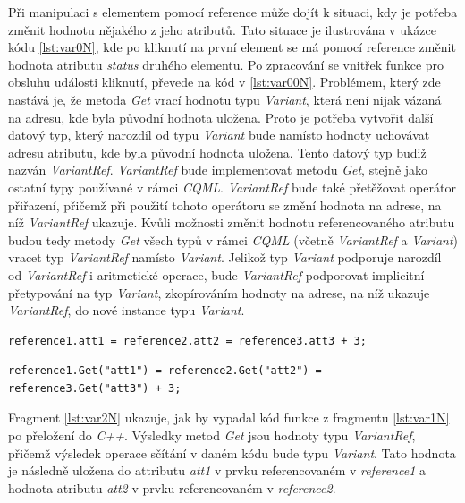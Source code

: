 \documentclass[11pt,twoside,a4paper]{book}
\begin{document}
Při manipulaci s elementem pomocí reference může dojít k situaci, kdy je potřeba změnit hodnotu nějakého z jeho atributů. Tato situace je ilustrována v ukázce kódu \ref{lst:var0N}, kde po kliknutí na první element se má pomocí reference změnit hodnota atributu \textit{status} druhého elementu. Po zpracování se vnitřek funkce pro obsluhu události kliknutí, převede na kód v \ref{lst:var00N}. Problémem, který zde nastává je, že metoda \textit{Get} vrací hodnotu typu \textit{Variant}, která není nijak vázaná na adresu, kde byla původní hodnota uložena. Proto je potřeba vytvořit další datový typ, který narozdíl od typu \textit{Variant} bude namísto hodnoty uchovávat adresu atributu, kde byla původní hodnota uložena. Tento datový typ budiž nazván \textit{VariantRef}. \textit{VariantRef} bude implementovat metodu \textit{Get}, stejně jako ostatní typy používané v rámci \textit{CQML}. \textit{VariantRef} bude také přetěžovat operátor přiřazení, přičemž při použití tohoto operátoru se změní hodnota na adrese, na níž \textit{VariantRef} ukazuje. Kvůli možnosti změnit hodnotu referencovaného atributu budou tedy metody \textit{Get} všech typů v rámci \textit{CQML} (včetně \textit{VariantRef} a \textit{Variant}) vracet typ \textit{VariantRef} namísto \textit{Variant}. Jelikož typ \textit{Variant} podporuje narozdíl od \textit{VariantRef} i aritmetické operace, bude \textit{VariantRef} podporovat implicitní přetypování na typ \textit{Variant}, zkopírováním hodnoty na adrese, na níž ukazuje \textit{VariantRef}, do nové instance typu \textit{Variant}.\\


\begin{lstlisting}[frame=single,caption=Řádek \textit{CQML} kódu ilustrující přístup k atributům elementů uložených v referenci.,label=lst:var1N]
reference1.att1 = reference2.att2 = reference3.att3 + 3;
\end{lstlisting}

\begin{lstlisting}[frame=single,caption=Kód ilustrující operace s typy \textit{Variant} a \textit{VariantRef}. ,label=lst:var2N]
reference1.Get("att1") = reference2.Get("att2") = reference3.Get("att3") + 3;
\end{lstlisting}
Fragment \ref{lst:var2N} ukazuje, jak by vypadal kód funkce z fragmentu \ref{lst:var1N} po přeložení do \textit{C++}. Výsledky metod \textit{Get} jsou hodnoty typu \textit{VariantRef}, přičemž výsledek operace sčítání v daném kódu bude typu \textit{Variant}. Tato hodnota je následně uložena do attributu \textit{att1} v prvku referencovaném v \textit{reference1} a hodnota atributu \textit{att2} v prvku referencovaném v \textit{reference2}.\\
\end{document}

